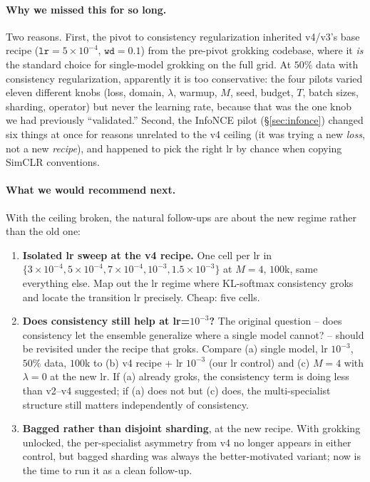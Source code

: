 \documentclass[11pt,a4paper]{article}
\begin{document}
\paragraph{Why we missed this for so long.}
Two reasons. First, the pivot to consistency regularization inherited
v4/v3's base recipe
($\mathtt{lr}{=}5{\times}10^{-4}$, $\mathtt{wd}{=}0.1$) from the
pre-pivot grokking codebase, where it \emph{is} the standard choice
for single-model grokking on the full grid. At $50\%$ data with
consistency regularization, apparently it is too conservative: the
four pilots varied eleven different knobs (loss, domain, $\lambda$,
warmup, $M$, seed, budget, $T$, batch sizes, sharding, operator) but
never the learning rate, because that was the one knob we had
previously ``validated.'' Second, the InfoNCE pilot
(\S\ref{sec:infonce}) changed six things at once for reasons
unrelated to the v4 ceiling (it was trying a new \emph{loss}, not a
new \emph{recipe}), and happened to pick the right lr by chance when
copying SimCLR conventions.

\paragraph{What we would recommend next.}
With the ceiling broken, the natural follow-ups are about the new
regime rather than the old one:
\begin{enumerate}[leftmargin=*,itemsep=1pt]
  \item \textbf{Isolated lr sweep at the v4 recipe.} One cell per lr in
        $\{3{\times}10^{-4}, 5{\times}10^{-4}, 7{\times}10^{-4},
        10^{-3}, 1.5{\times}10^{-3}\}$ at $M{=}4$, $100$k, same
        everything else. Map out the lr regime where KL-softmax
        consistency groks and locate the transition lr precisely.
        Cheap: five cells.
  \item \textbf{Does consistency still help at lr=$10^{-3}$?} The
        original question -- does consistency let the ensemble
        generalize where a single model cannot? -- should be revisited
        under the recipe that groks. Compare (a) single model, lr
        $10^{-3}$, $50\%$ data, $100$k to (b) v4 recipe + lr $10^{-3}$
        (our lr control) and (c) $M{=}4$ with $\lambda{=}0$ at the new
        lr. If (a) already groks, the consistency term is doing less
        than v2--v4 suggested; if (a) does not but (c) does, the
        multi-specialist structure still matters independently of
        consistency.
  \item \textbf{Bagged rather than disjoint sharding}, at the new
        recipe. With grokking unlocked, the per-specialist asymmetry
        from v4 no longer appears in either control, but bagged
        sharding was always the better-motivated variant; now is the
        time to run it as a clean follow-up.
\end{enumerate}
\end{document}
